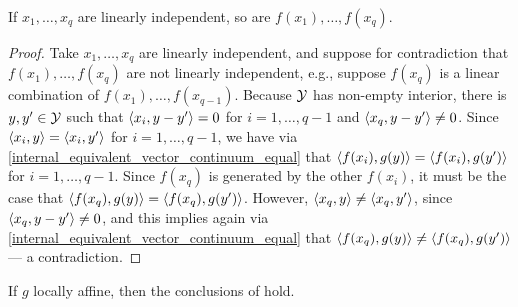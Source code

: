 \documentclass[twoside, 11pt]{article}
\begin{document}
\begin{lemma}\label{lem:f}
If $x_1, \dots, x_q$ are linearly independent, so are $f(x_1), \dots, f(x_q)$. 
\end{lemma}

\begin{proof}
Take $x_1, \dots, x_q$ are linearly independent, and suppose for contradiction that $f(x_1), \dots, f(x_q)$ are not linearly independent, e.g., suppose $f(x_q)$ is a linear combination of $f(x_1), \dots, f(x_{q-1})$. Because $\mathcal{Y}$ has non-empty interior, there is $y,y' \in \mathcal{Y}$ such that $\langle x_i, y-y'\rangle = 0$ for $i = 1, \dots, q-1$ and $\langle x_q, y-y'\rangle \ne 0$. 
Since $\langle x_i, y\rangle = \langle x_i, y'\rangle $ for $i = 1, \dots, q-1$, we have via \eqref{internal_equivalent_vector_continuum_equal} that $\langle f(x_i), g(y)\rangle = \langle f(x_i), g(y')\rangle$ for $i = 1, \dots, q-1$. Since $f(x_q)$ is generated by the other $f(x_i)$, it must be the case that $\langle f(x_q), g(y)\rangle = \langle f(x_q), g(y')\rangle$.
However, $\langle x_q, y\rangle \ne \langle x_q, y'\rangle$, since $\langle x_q, y-y'\rangle \ne 0$, and this implies again via \eqref{internal_equivalent_vector_continuum_equal} that $\langle f(x_q), g(y)\rangle \ne \langle f(x_q), g(y')\rangle$ --- a contradiction.
\end{proof}

%

\begin{lemma}
\label{lem:g_affine}
If $g$ locally affine, then the conclusions of  hold.
\end{lemma}
\end{document}
